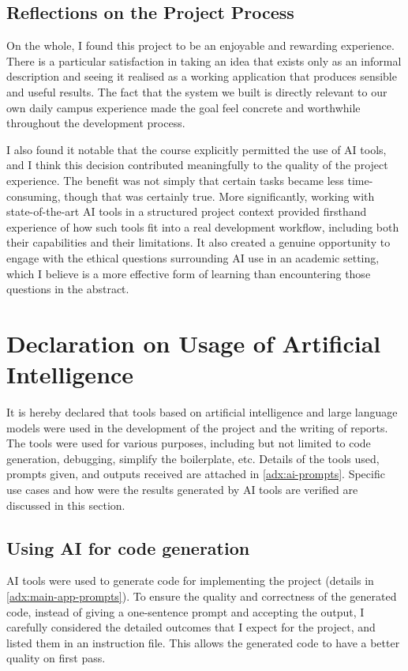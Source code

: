 \documentclass[a4paper,10pt]{amsart}
\begin{document}
\subsection{Reflections on the Project Process}

On the whole, I found this project to be an enjoyable and rewarding experience.
There is a particular satisfaction in taking an idea that exists only as an informal description and seeing it realised as a working application that produces sensible and useful results.
The fact that the system we built is directly relevant to our own daily campus experience made the goal feel concrete and worthwhile throughout the development process.

I also found it notable that the course explicitly permitted the use of AI tools, and I think this decision contributed meaningfully to the quality of the project experience.
The benefit was not simply that certain tasks became less time-consuming, though that was certainly true.
More significantly, working with state-of-the-art AI tools in a structured project context provided firsthand experience of how such tools fit into a real development workflow, including both their capabilities and their limitations.
It also created a genuine opportunity to engage with the ethical questions surrounding AI use in an academic setting, which I believe is a more effective form of learning than encountering those questions in the abstract.

\section{Declaration on Usage of Artificial Intelligence}

It is hereby declared that tools based on artificial intelligence and large language models were used in the development of the project and the writing of reports.
The tools were used for various purposes, including but not limited to code generation, debugging, simplify the boilerplate, etc.
Details of the tools used, prompts given, and outputs received are attached in \autoref{adx:ai-prompts}.
Specific use cases and how were the results generated by AI tools are verified are discussed in this section.

\subsection{Using AI for code generation}

AI tools were used to generate code for implementing the project (details in \autoref{adx:main-app-prompts}).
To ensure the quality and correctness of the generated code, instead of giving a one-sentence prompt and accepting the output, I carefully considered the detailed outcomes that I expect for the project, and listed them in an instruction file.
This allows the generated code to have a better quality on first pass.
\end{document}

